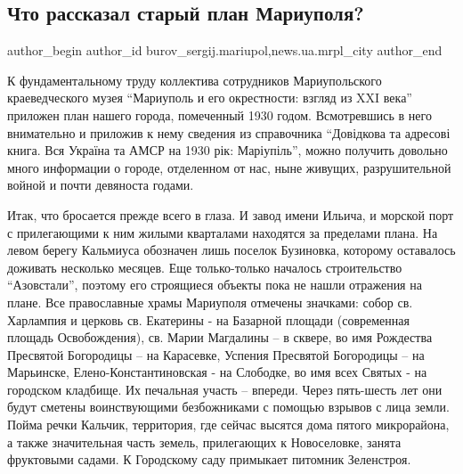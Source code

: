  
 
 
 
 
 
\subsection{Что рассказал старый план Мариуполя?}
\label{sec:29_11_2019.stz.news.ua.mrpl_city.1.chto_rasskazal_staryj_plan_mariupolja}
 
\ifcmt
 author_begin
   author_id burov_sergij.mariupol,news.ua.mrpl_city
 author_end
\fi


К фундаментальному труду коллектива сотрудников Мариупольского краеведческого
музея \enquote{Мариуполь и его окрестности: взгляд из XXΙ века} приложен план нашего
города, помеченный 1930 годом. Всмотревшись в него внимательно и приложив к
нему сведения из справочника \enquote{Довідкова та адресові книга. Вся Україна та АМСР
на 1930 рік: Маріупіль}, можно получить довольно много информации о городе,
отделенном от нас, ныне живущих, разрушительной войной и почти девяноста
годами.

Итак, что бросается прежде всего в глаза. И завод имени Ильича, и морской порт
с прилегающими к ним жилыми кварталами находятся за пределами плана. На левом
берегу Кальмиуса обозначен лишь поселок Бузиновка, которому оставалось доживать
несколько месяцев. Еще только-только началось строительство \enquote{Азовстали},
поэтому его строящиеся объекты пока не нашли отражения на плане. Все
православные храмы Мариуполя отмечены значками: собор св. Харлампия и церковь
св. Екатерины - на Базарной площади (современная площадь Освобождения), св.
Марии Магдалины – в сквере, во имя Рождества Пресвятой Богородицы – на
Карасевке, Успения Пресвятой Богородицы – на Марьинске, Елено-Константиновская
- на Слободке, во имя всех Святых - на городском кладбище. Их печальная участь
– впереди. Через пять-шесть лет они будут сметены воинствующими безбожниками с
помощью взрывов с лица земли. Пойма речки Кальчик, территория, где сейчас
высятся дома пятого микрорайона, а также значительная часть земель, прилегающих
к Новоселовке, занята фруктовыми садами. К Городскому саду примыкает питомник
Зеленстроя.

